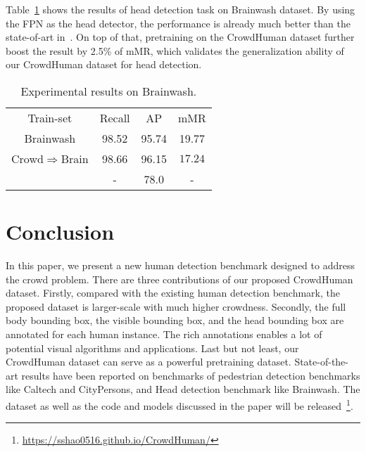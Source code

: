 \documentclass[10pt,twocolumn,letterpaper]{article}
\begin{document}
Table~\ref{table:brainwash} shows the results of head detection task on Brainwash dataset. By using the FPN as the head detector, the performance is already much better than the state-of-art in~\cite{stewart2016end}. On top of that, pretraining on the CrowdHuman dataset further boost the result by 2.5\% of mMR, which validates the generalization ability of our CrowdHuman dataset for head detection. 


\setlength{\tabcolsep}{4pt}
\begin{table}
\begin{center}
\caption{Experimental results on Brainwash.}
\label{table:brainwash}
\begin{tabular}{cccc}
\hline\noalign{\smallskip}
{Train-set} & Recall & AP & mMR\\
\noalign{\smallskip}
\hline
\noalign{\smallskip}
Brainwash & {98.52} & {95.74} & {19.77}\\
Crowd$\Rightarrow$Brain & {98.66}  & {96.15} & {$\mathbf{17.24}$}\\
\hline
\hline
\cite{stewart2016end} & - & {78.0} & -\\
\hline
\end{tabular}
\end{center}
\end{table}
\setlength{\tabcolsep}{1.4pt}




\section{Conclusion}
In this paper, we present a new human detection benchmark designed to address the crowd problem. There are three contributions of our proposed CrowdHuman dataset. Firstly, compared with the existing human detection benchmark, the proposed dataset is larger-scale with much higher crowdness. Secondly, the full body bounding box, the visible bounding box, and the head bounding box are annotated for each human instance. The rich annotations enables a lot of potential visual algorithms and applications. Last but not least, our CrowdHuman dataset can serve as a powerful pretraining dataset. State-of-the-art results have been reported on benchmarks of pedestrian detection benchmarks like Caltech and CityPersons, and Head detection benchmark like Brainwash. The dataset as well as the code and models discussed in the paper will be released~\footnote{\url{https://sshao0516.github.io/CrowdHuman/}}.


{\small


}
\end{document}
